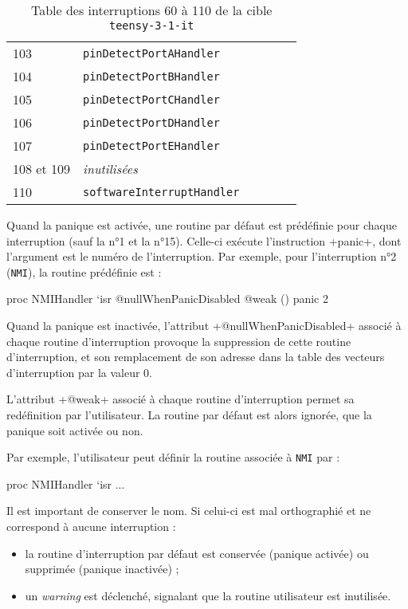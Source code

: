 \begin{table}[!t]
\begin{tabular}{llllll}
    103  & \texttt{pinDetectPortAHandler}\\
    104  & \texttt{pinDetectPortBHandler}\\
    105  & \texttt{pinDetectPortCHandler}\\
    106  & \texttt{pinDetectPortDHandler}\\
    107  & \texttt{pinDetectPortEHandler}\\
    108 et 109  & \emph{inutilisées} \\
    110  & \texttt{softwareInterruptHandler}
  \end{tabular}
  \caption{Table des interruptions 60 à 110 de la cible \texttt{teensy-3-1-it}}
  \ligne
\end{table}



Quand la panique est activée, une routine par défaut est prédéfinie pour chaque interruption (sauf la n°1 et la n°15). Celle-ci exécute l'instruction \plm+panic+, dont l'argument est le numéro de l'interruption. Par exemple, pour l'interruption n°2 (\texttt{NMI}), la routine prédéfinie est :
\begin{PLM}[1]
proc NMIHandler `isr @nullWhenPanicDisabled @weak () {
  panic 2
}
\end{PLM}



Quand la panique est inactivée, l'attribut \plm+@nullWhenPanicDisabled+ associé à chaque routine d'interruption provoque la suppression de cette routine d'interruption, et son remplacement de son adresse dans la table des vecteurs d'interruption par la valeur $0$.




L'attribut \plm+@weak+ associé à chaque routine d'interruption permet sa redéfinition par l'utilisateur. La routine par défaut est alors ignorée, que la panique soit activée ou non.

Par exemple, l'utilisateur peut définir la routine associée à \texttt{NMI} par :
\begin{PLM}[1]
proc NMIHandler `isr {
  ...
}
\end{PLM}

Il est important de conserver le nom. Si celui-ci est mal orthographié et ne correspond à aucune interruption :
\begin{itemize}
  \item la routine d'interruption par défaut est conservée (panique activée) ou supprimée (panique inactivée) ;
  \item un \emph{warning} est déclenché, signalant que la routine utilisateur est inutilisée.
\end{itemize}



